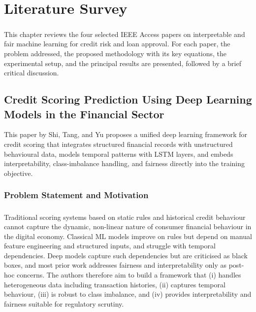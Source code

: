 \documentclass[12pt,a4paper,final]{extreport}
\begin{document}
\chapter{Literature Survey}

\paragraph{} This chapter reviews the four selected IEEE Access papers on interpretable and fair machine learning for credit risk and loan approval. For each paper, the problem addressed, the proposed methodology with its key equations, the experimental setup, and the principal results are presented, followed by a brief critical discussion.

\section{Credit Scoring Prediction Using Deep Learning Models in the Financial Sector}

This paper by Shi, Tang, and Yu \cite{p1} proposes a unified deep learning framework for credit scoring that integrates structured financial records with unstructured behavioural data, models temporal patterns with LSTM layers, and embeds interpretability, class-imbalance handling, and fairness directly into the training objective.

\subsection{Problem Statement and Motivation}

\paragraph{} Traditional scoring systems based on static rules and historical credit behaviour cannot capture the dynamic, non-linear nature of consumer financial behaviour in the digital economy. Classical ML models improve on rules but depend on manual feature engineering and structured inputs, and struggle with temporal dependencies. Deep models capture such dependencies but are criticised as black boxes, and most prior work addresses fairness and interpretability only as post-hoc concerns. The authors therefore aim to build a framework that (i) handles heterogeneous data including transaction histories, (ii) captures temporal behaviour, (iii) is robust to class imbalance, and (iv) provides interpretability and fairness suitable for regulatory scrutiny.
\end{document}
